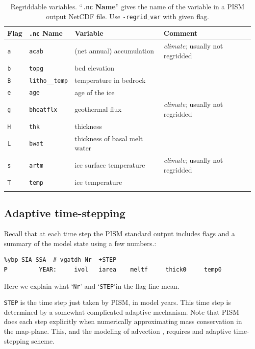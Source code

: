 \documentclass[11pt,final]{amsart}
\newcommand{\und}{\_\!\_}
\begin{document}
\begin{table}[ht]
\caption{Regriddable variables.\index{regrid\und vars}  ``\texttt{.nc} \textbf{Name}'' gives the name of the variable in a PISM output NetCDF file.  Use \texttt{-regrid$\underline{\phantom{b}}$var} with given flag.}\label{tab:regridvar}
\begin{tabular}{@{}llll}\hline
\textbf{Flag} & \texttt{.nc} \textbf{Name} & \textbf{Variable} & \textbf{Comment}\\ \hline
\verb|a| & \texttt{acab}       & (net annual) accumulation & \emph{climate}; usually not regridded \\
\verb|b| & \texttt{topg}       & bed elevation & \\
\verb|B| & \texttt{litho\und temp} & temperature in bedrock & \\
\verb|e| & \texttt{age}        & age of the ice & \\
\verb|g| & \texttt{bheatflx}   & geothermal flux & \emph{climate}; usually not regridded \\
\verb|H| & \texttt{thk}        & thickness & \\
\verb|L| & \texttt{bwat}       & thickness of basal melt water & \\
\verb|s| & \texttt{artm}       & ice surface temperature & \emph{climate}; usually not regridded\\
\verb|T| & \texttt{temp}       & ice temperature & \\
\hline
\normalsize
\end{tabular}
\end{table}


\subsection{Adaptive time-stepping} \label{subsect:adapt} Recall that at each time step the PISM standard output includes flags and a summary of the model state using a few numbers.:
\begin{verbatim}
%ybp SIA SSA  # vgatdh Nr  +STEP
P         YEAR:     ivol   iarea    meltf     thick0     temp0
\end{verbatim}
Here we explain what `\verb|Nr|' and `\verb|STEP|'in the flag line mean.

\verb|STEP| is the time step just taken by PISM, in model years.  This time step is determined by a somewhat complicated adaptive mechanism.  Note that PISM does each step explicitly when numerically approximating mass conservation in the map-plane.  This, and the modeling of advection \cite{BBL}, requires and adaptive time-stepping scheme.
\end{document}
